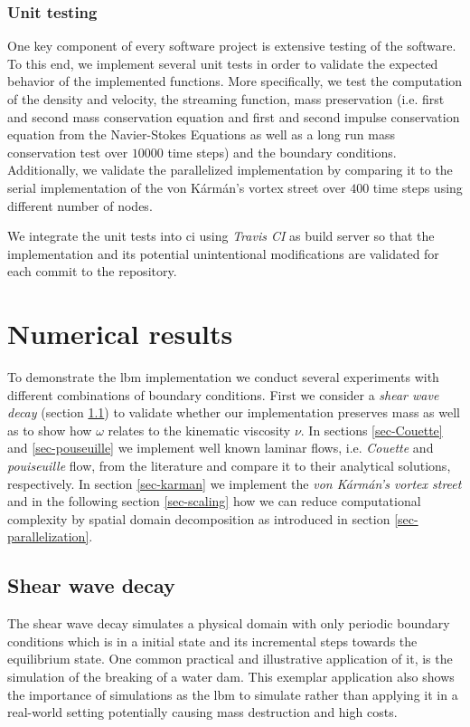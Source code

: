 \documentclass[a4paper,11pt, footsepline]{book}
\begin{document}
\subsection*{Unit testing}
One key component of every software project is extensive testing of the software. To this end, we implement several unit tests in order to validate the expected behavior of the implemented functions. 
More specifically, we test the computation of the density and velocity, the streaming function, mass preservation (i.e. first and second mass conservation equation and first and second impulse conservation equation from the Navier-Stokes Equations as well as a long run mass conservation test over $10000$ time steps) and the boundary conditions.
Additionally, we validate the parallelized implementation by comparing it to the serial implementation of the von K\'{a}rm\'{a}n's vortex street over $400$ time steps using different number of nodes. 

We integrate the unit tests into \ac{ci} using \textit{Travis CI} as build server so that the implementation and its potential unintentional modifications are validated for each commit to the repository.
\chapter{Numerical results}\label{ch-results}
To demonstrate the \ac{lbm} implementation we conduct several experiments with different combinations of boundary conditions. First we consider a \textit{shear wave decay} (section \ref{sec-shearWave}) to validate whether our implementation preserves mass as well as to show how $\omega$ relates to the kinematic viscosity $\nu$. In sections \ref{sec-Couette} and \ref{sec-pouseuille} we implement well known laminar flows, i.e. \textit{Couette} and \textit{pouiseuille} flow, from the literature and compare it to their analytical solutions, respectively. In section \ref{sec-karman} we implement the \textit{von K\'{a}rm\'{a}n's vortex street} and in the following section \ref{sec-scaling} how we can reduce computational complexity by spatial domain decomposition as introduced in section \ref{sec-parallelization}.
\section{Shear wave decay}\label{sec-shearWave}
The shear wave decay simulates a physical domain with only periodic boundary conditions which is in a initial state and its incremental steps towards the equilibrium state. One common practical and illustrative application of it, is the simulation of the breaking of a water dam. This exemplar application also shows the importance of simulations as the \ac{lbm} to simulate rather than applying it in a real-world setting potentially causing mass destruction and high costs.
\end{document}
